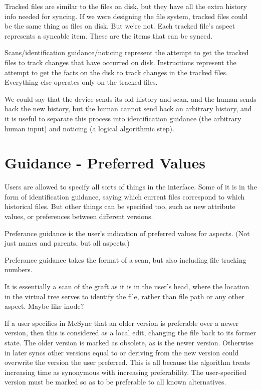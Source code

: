 \documentclass{book}
\begin{document}
Tracked files are similar to the files on disk, but they have all the extra history info needed for syncing.  If we were designing the file system, tracked files could be the same thing as files on disk.  But we're not.
Each tracked file's aspect represents a syncable item.  These are the items that can be synced.

Scans/identification guidance/noticing represent the attempt to get the tracked files to track changes that have occurred on disk.
Instructions represent the attempt to get the facts on the disk to track changes in the tracked files.
Everything else operates only on the tracked files.

We could say that the device sends its old history and scan, and the human sends back the new history, but the human cannot send back an arbitrary history, and it is useful to separate this process into identification guidance (the arbitrary human input) and noticing (a logical algorithmic step).


\section{Guidance - Preferred Values}

Users are allowed to specify all sorts of things in the interface.  Some of it is in the form of identification guidance, saying which current files correspond to which historical files.  But other things can be specified too, such as new attribute values, or preferences between different versions.

Preferance guidance is the user's indication of preferred values for aspects.  (Not just names and parents, but all aspects.)

Preferance guidance takes the format of a scan, but also including file tracking numbers.

It is essentially a scan of the graft as it is in the user's head, where the location in the virtual tree serves to identify the file, rather than file path or any other aspect.  Maybe like inode?

If a user specifies in McSync that an older version is preferable over a newer version, then this is considered as a local edit, changing the file back to its former state.  The older version is marked as obsolete, as is the newer version.  Otherwise in later syncs other versions equal to or deriving from the new version could overwrite the version the user preferred.  This is all because the algorithm treats increasing time as synonymous with increasing preferability.  The user-specified version must be marked so as to be preferable to all known alternatives.
\end{document}
